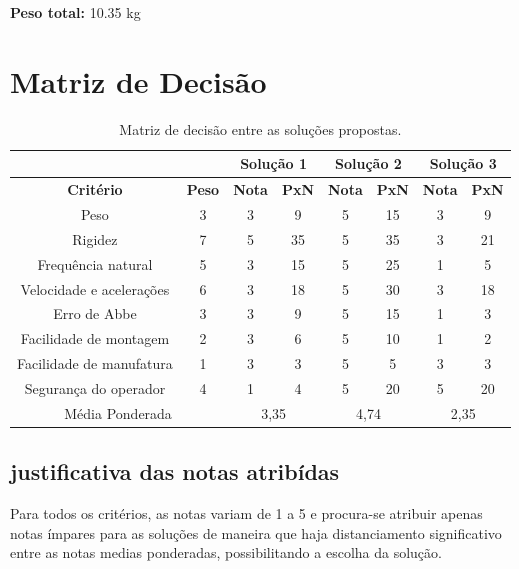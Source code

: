 \textbf{Peso total: }10.35 kg



\section{Matriz de Decisão}

\begin{table}[h]
    \centering
    \begin{tabular}{|c|c|c|c|c|c|c|c|} \hline 
        \multicolumn{2}{|c|}{}& \multicolumn{2}{|c|}{\textbf{Solução 1}} & \multicolumn{2}{|c|}{\textbf{Solução 2}} & \multicolumn{2}{|c|}{\textbf{Solução 3}} \\ \hline  \textbf{Critério}&  \textbf{Peso}& \textbf{Nota} & \textbf{PxN} & \textbf{Nota} & \textbf{PxN} & \textbf{Nota} & \textbf{PxN} \\ \hline  
        Peso & 3 & 3& 9& 5& 15& 3& 9
\\ \hline  
        Rigidez & 7 & 5& 35& 5& 35& 3& 21
\\ \hline  
        Frequência natural & 5 & 3& 15& 5& 25& 1& 5
\\ \hline  
        Velocidade e acelerações & 6 & 3& 18& 5& 30& 3& 18
\\ \hline  
        Erro de Abbe & 3 & 3& 9& 5& 15& 1& 3
\\ \hline  
        Facilidade de montagem & 2 & 3& 6& 5& 10& 1& 2
\\ \hline  
        Facilidade de manufatura & 1 & 3& 3& 5& 5& 3& 3
\\ \hline  
        Segurança do operador & 4 & 1& 4& 5& 20& 5& 20\\ \hline  
 \multicolumn{2}{|c|}{Média Ponderada}& \multicolumn{2}{|c|}{3,35}& \multicolumn{2}{|c|}{4,74}& \multicolumn{2}{|c|}{2,35}\\ \hline 
    \end{tabular}
    \caption{Matriz de decisão entre as soluções propostas.}
    \label{tab:comparativa}
\end{table}

\subsection{justificativa das notas atribídas}

Para todos os critérios, as notas variam de 1 a 5 e procura-se atribuir apenas notas ímpares para as soluções de maneira que haja distanciamento significativo entre as notas medias ponderadas, possibilitando a escolha da solução. 

